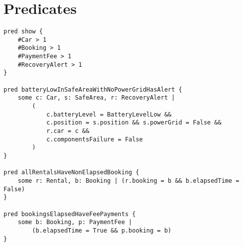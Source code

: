 \section{Predicates}

\lstset{language=alloy}

\begin{lstlisting}
pred show {
	#Car > 1
	#Booking > 1
	#PaymentFee > 1
	#RecoveryAlert > 1
}

pred batteryLowInSafeAreaWithNoPowerGridHasAlert {
	some c: Car, s: SafeArea, r: RecoveryAlert |
		(
			c.batteryLevel = BatteryLevelLow &&
			c.position = s.position && s.powerGrid = False &&
			r.car = c &&
			c.componentsFailure = False
		)
}

pred allRentalsHaveNonElapsedBooking {
	some r: Rental, b: Booking | (r.booking = b && b.elapsedTime = False)
}

pred bookingsElapsedHaveFeePayments {
	some b: Booking, p: PaymentFee |
		(b.elapsedTime = True && p.booking = b)
}
\end{lstlisting}